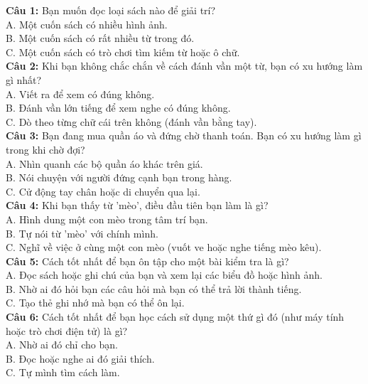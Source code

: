 \begin{multicols}{2}
\noindent
\textbf{Câu 1:} Bạn muốn đọc loại sách nào để giải trí? \\
A. Một cuốn sách có nhiều hình ảnh. \\
B. Một cuốn sách có rất nhiều từ trong đó. \\
C. Một cuốn sách có trò chơi tìm kiếm từ hoặc ô chữ. \\

\textbf{Câu 2:} Khi bạn không chắc chắn về cách đánh vần một từ, bạn có xu hướng làm gì nhất? \\
A. Viết ra để xem có đúng không. \\
B. Đánh vần lớn tiếng để xem nghe có đúng không. \\
C. Dò theo từng chữ cái trên không (đánh vần bằng tay). \\

\textbf{Câu 3:} Bạn đang mua quần áo và đứng chờ thanh toán. Bạn có xu hướng làm gì trong khi chờ đợi? \\
A. Nhìn quanh các bộ quần áo khác trên giá. \\
B. Nói chuyện với người đứng cạnh bạn trong hàng. \\
C. Cử động tay chân hoặc di chuyển qua lại. \\

\textbf{Câu 4:} Khi bạn thấy từ 'mèo', điều đầu tiên bạn làm là gì? \\
A. Hình dung một con mèo trong tâm trí bạn. \\
B. Tự nói từ 'mèo' với chính mình. \\
C. Nghĩ về việc ở cùng một con mèo (vuốt ve hoặc nghe tiếng mèo kêu). \\

\textbf{Câu 5:} Cách tốt nhất để bạn ôn tập cho một bài kiểm tra là gì? \\
A. Đọc sách hoặc ghi chú của bạn và xem lại các biểu đồ hoặc hình ảnh. \\
B. Nhờ ai đó hỏi bạn các câu hỏi mà bạn có thể trả lời thành tiếng. \\
C. Tạo thẻ ghi nhớ mà bạn có thể ôn lại. \\

\textbf{Câu 6:} Cách tốt nhất để bạn học cách sử dụng một thứ gì đó (như máy tính hoặc trò chơi điện tử) là gì? \\
A. Nhờ ai đó chỉ cho bạn. \\
B. Đọc hoặc nghe ai đó giải thích. \\
C. Tự mình tìm cách làm. \\


\end{multicols}

